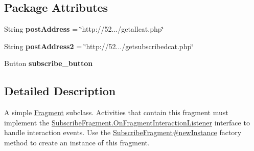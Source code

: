 \subsection*{\-Package \-Attributes}
\begin{DoxyCompactItemize}
\item 
\hypertarget{classcom_1_1example_1_1sel_1_1lostfound_1_1SubscribeFragment_ac660e1e7a61b24c751595962f5c3495d}{\-String {\bfseries post\-Address} = \char`\"{}http\-://52.../getallcat.\-php\char`\"{}}\label{classcom_1_1example_1_1sel_1_1lostfound_1_1SubscribeFragment_ac660e1e7a61b24c751595962f5c3495d}

\item 
\hypertarget{classcom_1_1example_1_1sel_1_1lostfound_1_1SubscribeFragment_a9f0d6661e6347af9b678abd1e883a602}{\-String {\bfseries post\-Address2} = \char`\"{}http\-://52.../getsubscribedcat.\-php\char`\"{}}\label{classcom_1_1example_1_1sel_1_1lostfound_1_1SubscribeFragment_a9f0d6661e6347af9b678abd1e883a602}

\item 
\hypertarget{classcom_1_1example_1_1sel_1_1lostfound_1_1SubscribeFragment_afcc89336a65d7e088ce327db4927a78f}{\-Button {\bfseries subscribe\-\_\-button}}\label{classcom_1_1example_1_1sel_1_1lostfound_1_1SubscribeFragment_afcc89336a65d7e088ce327db4927a78f}

\end{DoxyCompactItemize}


\subsection{\-Detailed \-Description}
\-A simple \hyperlink{}{\-Fragment} subclass. \-Activities that contain this fragment must implement the \hyperlink{interfacecom_1_1example_1_1sel_1_1lostfound_1_1SubscribeFragment_1_1OnFragmentInteractionListener}{\-Subscribe\-Fragment.\-On\-Fragment\-Interaction\-Listener} interface to handle interaction events. \-Use the \hyperlink{classcom_1_1example_1_1sel_1_1lostfound_1_1SubscribeFragment_ac622c73212970653128ddfb06d38572a}{\-Subscribe\-Fragment\#new\-Instance} factory method to create an instance of this fragment. 

